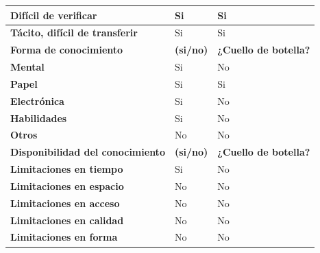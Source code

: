 \documentclass[a4paper,11pt]{article}
\begin{document}
\begin{center}
\begin{tabular}{| p{6.3cm} | l | p{3.8cm} |}
					\hline
					\cellcolor[RGB]{224,233,250}\textbf{Difícil de verificar} & Si & Si \\
					\hline
					\cellcolor[RGB]{224,233,250}\textbf{Tácito, difícil de transferir} & Si &
					Si \\
					\hline
					\cellcolor[RGB]{224,233,250}\textbf{Forma de conocimiento} &
					\cellcolor[RGB]{224,233,250}\textbf{(si/no)} &
					\cellcolor[RGB]{224,233,250}\textbf{¿Cuello de botella?}\\
					\hline
					\cellcolor[RGB]{224,233,250}\textbf{Mental} & Si & No\\
					\hline
					\cellcolor[RGB]{224,233,250}\textbf{Papel} & Si & Si\\
					\hline
					\cellcolor[RGB]{224,233,250}\textbf{Electrónica} & Si & No\\
					\hline
					\cellcolor[RGB]{224,233,250}\textbf{Habilidades} & Si & No\\
					\hline
					\cellcolor[RGB]{224,233,250}\textbf{Otros} & No & No\\
					\hline
					\cellcolor[RGB]{224,233,250}\textbf{Disponibilidad del conocimiento} &
					\cellcolor[RGB]{224,233,250}\textbf{(si/no)} &
					\cellcolor[RGB]{224,233,250}\textbf{¿Cuello de botella?}\\
					\hline
					\cellcolor[RGB]{224,233,250}\textbf{Limitaciones en tiempo} & Si & No\\
					\hline
					\cellcolor[RGB]{224,233,250}\textbf{Limitaciones en espacio} & No & No\\
					\hline
					\cellcolor[RGB]{224,233,250}\textbf{Limitaciones en acceso} & No & No\\
					\hline
					\cellcolor[RGB]{224,233,250}\textbf{Limitaciones en calidad} & No & No\\
					\hline
					\cellcolor[RGB]{224,233,250}\textbf{Limitaciones en forma} & No & No\\
					\hline
				\end{tabular}
			\end{center}
			\newpage
\end{document}
